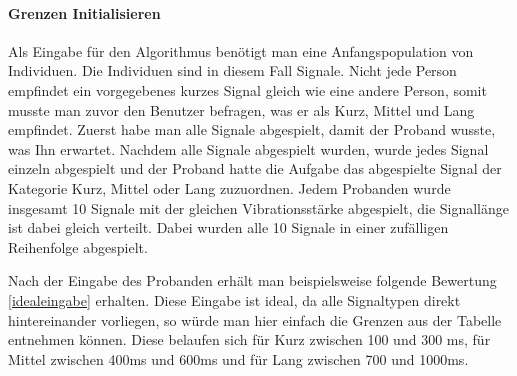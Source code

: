 
\paragraph{Grenzen Initialisieren}
Als Eingabe f{\"u}r den Algorithmus ben{\"o}tigt man eine Anfangspopulation von Individuen. Die Individuen sind in diesem Fall Signale. 
Nicht jede Person empfindet ein vorgegebenes kurzes Signal gleich wie eine andere Person, somit musste man zuvor den Benutzer befragen, was er als Kurz, Mittel und Lang empfindet. Zuerst habe man alle Signale abgespielt, damit der Proband wusste, was Ihn erwartet. 
Nachdem alle Signale abgespielt wurden, wurde jedes Signal einzeln abgespielt und der Proband hatte die Aufgabe das abgespielte Signal der Kategorie Kurz, Mittel oder Lang zuzuordnen. 
Jedem Probanden wurde insgesamt 10 Signale mit der gleichen Vibrationsst{\"a}rke abgespielt, die Signall{\"a}nge ist dabei gleich verteilt.
Dabei wurden alle 10 Signale in einer zuf{\"a}lligen Reihenfolge abgespielt.

Nach der Eingabe des Probanden erh{\"a}lt man beispielsweise folgende Bewertung \autoref{idealeingabe} erhalten. Diese Eingabe ist ideal, da alle Signaltypen direkt hintereinander vorliegen, so w{\"u}rde man hier einfach die Grenzen aus der Tabelle entnehmen k{\"o}nnen. Diese belaufen sich f{\"u}r Kurz zwischen 100 und 300 ms, f{\"u}r Mittel zwischen 400ms und 600ms und f{\"u}r Lang zwischen 700 und 1000ms.

\begin{table}[]
\centering
\caption{Bewertung eines Probanden die Ideal ist. Dabei ist die \textit{L{\"a}nge} die Signall{\"a}nge in ms und \textit{Erkannt} ist das erkannte Signal durch dem Benutzer }
\label{idealeingabe}
\end{table}

